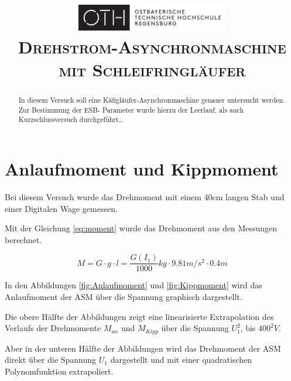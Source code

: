\documentclass[conference]{IEEEtran}
\begin{document}
\title{
    \centering
    \includegraphics[width=0.5\textwidth]{../OTHR_OTHR_Logo.pdf}\\
    \textsc{Drehstrom-Asynchronmaschine mit Schleifringläufer} \\
}

\maketitle

\begin{abstract}
    In diesem Versuch soll eine Käfigläufer-Asynchronmaschine genauer
    untersucht werden. Zur Bestimmung der ESB- Parameter wurde hierzu der
    Leerlauf, als auch Kurzschlussversuch durchgeführt\dots
\end{abstract}

\section{Anlaufmoment und Kippmoment}

Bei diesem Versuch wurde das Drehmoment mit einem 40cm langen Stab und einer
Digitalen Wage gemessen.

Mit der Gleichung \ref{eq:moment} wurde das Drehmoment aus den Messungen berechnet.

\begin{equation} \label{eq:moment}
    M=G\cdot g\cdot l = \frac{G(I_1)}{1000}\si{kg}\cdot 9.81\si{m/s^2} \cdot 0.4\si{m}
\end{equation}

In den Abbildungen \ref{fig:Anlaufmoment} und \ref{fig:Kippmoment} wird das
Anlaufmoment der ASM über die Spannung graphisch dargestellt.

Die obere Hälfte der Abbildungen zeigt eine linearisierte Extrapolation des
Verlaufs der Drehmomente $M_{an}$ und $M_{\textit{Kipp}}$ über die Spannung
$U_1^2$, bis $400^2V$.

Aber in der unteren Hälfte der Abbildungen wird das Drehmoment der ASM direkt
über die Spannung $U_1$ dargestellt und mit einer quadratischen Polynomfunktion
extrapoliert.
\end{document}
